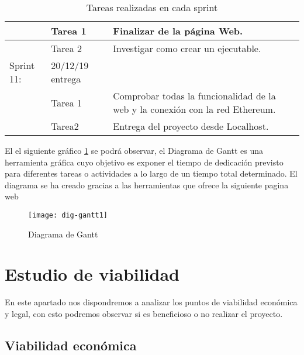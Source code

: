 \begin{table}[H]
\begin{tabular}{|p{1.5cm}|p{1.5cm}|p{5cm}}
                         & Tarea 1                       & \multicolumn{1}{p{9.2cm}|}{Finalizar de la página Web.}                                                                  \\ \hline
                         & Tarea 2                       & \multicolumn{1}{p{9.2cm}|}{Investigar como crear un ejecutable.}                                                         \\ \hline
Sprint 11:               & 20/12/19  entrega  & \multicolumn{1}{l|}{}                                                                                             \\ \hline
                         & Tarea 1                       & \multicolumn{1}{p{9.2cm}|}{Comprobar todas la funcionalidad de la web y la conexión con la red Ethereum.}                \\ \hline
                         & Tarea2                        & \multicolumn{1}{p{9.2cm}|}{Entrega del proyecto desde Localhost.}                                                        \\ \hline
\end{tabular}
\caption{Tareas realizadas en cada sprint}
\label{tabla:sprint1}
\end{table}

El el siguiente gráfico \ref{ref:gantt} se podrá observar, el Diagrama de Gantt \cite{gantt} es una herramienta gráfica cuyo objetivo es exponer el tiempo de dedicación previsto para diferentes tareas o actividades a lo largo de un tiempo total determinado. El diagrama se ha creado gracias a las herramientas que ofrece la siguiente pagina web \cite{ganttGrafico}

\begin{figure}[H]
    \centering
    \texttt{[image: dig-gantt1]}
    \caption{Diagrama de Gantt}
    \label{ref:gantt}
\end{figure}

\section{Estudio de viabilidad}

En este apartado nos dispondremos a analizar los puntos de  viabilidad económica y legal, con esto podremos observar si es beneficioso o no realizar el proyecto.

\subsection{Viabilidad económica}

